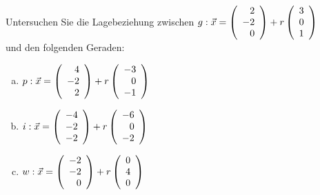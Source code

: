 \begin{aufgabe} ~ \\ 
Untersuchen Sie die Lagebeziehung zwischen $g: \vec{x}=\Vekd{2}{-2}{0} + r\Vekd{3}{0}{1}$\\ und den folgenden Geraden:\begin{enumerate}[a)] 
\item 
$p: \vec{x}=\Vekd{4}{-2}{2} + r\Vekd{-3}{0}{-1}$
\item 
$i: \vec{x}=\Vekd{-4}{-2}{-2} + r\Vekd{-6}{0}{-2}$
\item 
$w: \vec{x}=\Vekd{-2}{-2}{0} + r\Vekd{0}{4}{0}$
\end{enumerate} 
\end{aufgabe} 
